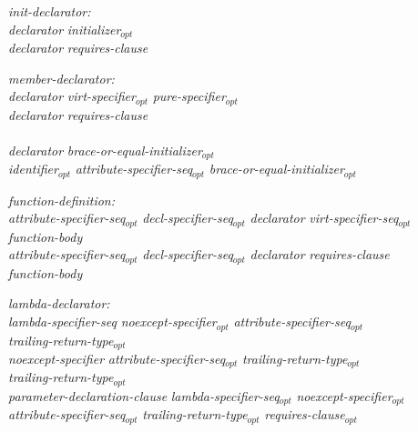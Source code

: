 \begin{adjustwidth}{0.5cm}{0.5cm}

\emph{init-declarator:} \\
\phantom{~~~}\emph{declarator} \emph{initializer}$_{opt}$ \\
\phantom{~~~}\emph{declarator} \emph{requires-clause} \\
\phantom{~~~}

\emph{member-declarator:} \\
\phantom{~~~}\emph{declarator} \emph{virt-specifier}$_{opt}$ \emph{pure-specifier}$_{opt}$  \\
\phantom{~~~}\emph{declarator} \emph{requires-clause} \\
\phantom{~~~} \\
\phantom{~~~}\emph{declarator} \emph{brace-or-equal-initializer}$_{opt}$ \\
\phantom{~~~}\emph{identifier}$_{opt}$ \emph{attribute-specifier-seq}$_{opt}$ \tcode{:} \emph{brace-or-equal-initializer}$_{opt}$

\emph{function-definition:} \\
\phantom{~~~}\emph{attribute-specifier-seq}$_{opt}$ \emph{decl-specifier-seq}$_{opt}$ \emph{declarator} \emph{virt-specifier-seq}$_{opt}$  \\
\phantom{~~~~~~} \emph{function-body}\\
\phantom{~~~}\emph{attribute-specifier-seq}$_{opt}$ \emph{decl-specifier-seq}$_{opt}$ \emph{declarator} \emph{requires-clause} \\ 
\phantom{~~~~~~} \emph{function-body}

\emph{lambda-declarator:} \\
\phantom{~~~}\emph{lambda-specifier-seq} \emph{noexcept-specifier}$_{opt}$ \emph{attribute-specifier-seq}$_{opt}$ \\
\phantom{~~~~~~}\emph{trailing-return-type}$_{opt}$ \\
\phantom{~~~}\emph{noexcept-specifier} \emph{attribute-specifier-seq}$_{opt}$ \emph{trailing-return-type}$_{opt}$  \\
\phantom{~~~}\emph{trailing-return-type}$_{opt}$ \\
\phantom{~~~}\tcode{(} \emph{parameter-declaration-clause} \tcode{)} \emph{lambda-specifier-seq}$_{opt}$ \emph{noexcept-specifier}$_{opt}$ \\ \phantom{~~~~~~}\emph{attribute-specifier-seq}$_{opt}$ \emph{trailing-return-type}$_{opt}$ \emph{requires-clause}$_{opt}$ 


\end{adjustwidth}
